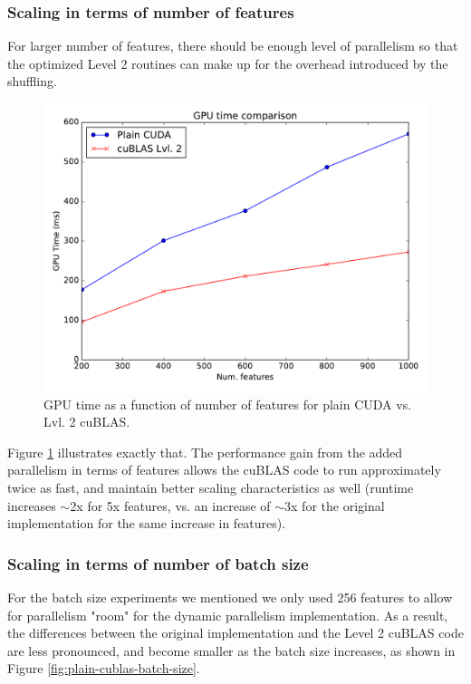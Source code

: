 \documentclass[11pt,a4paper]{article}
\begin{document}
\pagebreak

\subsubsection*{Scaling in terms of number of features}

For larger number of features, there should be enough level of parallelism so that
the optimized Level 2 routines can make up for the overhead introduced by the shuffling.

\begin{figure}[H]
	\centering
	\includegraphics[width=0.8\linewidth]{gpu_plain_vs_Lvl2cuBLAS-200f-1000f.pdf}
	\caption{GPU time as a function of number of features for plain CUDA  vs. Lvl. 2 cuBLAS.}
	\label{fig:plain-cublas-n-features}
\end{figure}

Figure \ref{fig:plain-cublas-n-features} illustrates exactly that. The performance gain
from the added parallelism in terms of features allows the cuBLAS code to run approximately twice
as fast, and maintain better scaling characteristics as well (runtime increases $\sim$2x for 5x features,
vs. an increase of $\sim$3x for the original implementation for the same increase in features).

\subsubsection*{Scaling in terms of number of batch size}

For the batch size experiments we mentioned we only used 256 features to allow for parallelism "room"
for the dynamic parallelism implementation. As a result, the differences between the original
implementation and the Level 2 cuBLAS code are less pronounced, and become smaller as the batch
size increases, as shown in Figure \ref{fig:plain-cublas-batch-size}.
\end{document}

